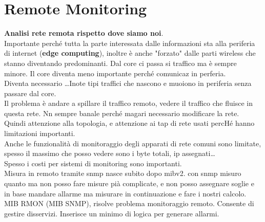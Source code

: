 \documentclass[10pt]{book}
\begin{document}
\chapter{Remote Monitoring}
\textbf{Analisi rete remota rispetto dove siamo noi}.\\
Importante perché tutta la parte interessata dalle informazioni sta alla periferia di internet (\textbf{edge computing}), inoltre è anche "forzato" dalle parti wireless che stanno diventando predominanti. Dal core ci passa si traffico ma è sempre minore. Il core diventa meno importante perché comunicaz in perferia.\\
Diventa necessario \ldots Inote tipi traffici che nascono e muoiono in periferia senza passare dal core.\\
Il problema è andare a spillare il traffico remoto, vedere il traffico che fluisce in questa rete. Nn sempre banale perché magari necessario modificare la rete. Quindi attenzione alla topologia, e attenzione ai tap di rete usati percHé hanno limitazioni importanti.\\
Anche le funzionalità di monitoraggio degli apparati di rete comuni sono limitate, spesso il massimo che posso vedere sono i byte totali, ip assegnati\ldots\\
Spesso i costi per sistemi di monitoring sono importanti.\\
Misura in remoto tramite snmp nasce subito dopo mibv2. con snmp misuro quanto ma non posso fare misure pià complicate, e non posso assegnare soglie e in base mandare allarme ma misurare in continuazione e fare i nostri calcolo.\\
MIB RMON (MIB SNMP), risolve problema monitoraggio remoto. Consente di gestire disservizi. Inserisce un minimo di logica per generare allarmi.
\end{document}
